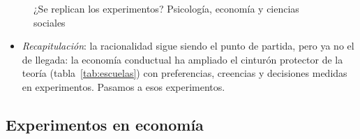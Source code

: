 \documentclass[11pt]{article}
\begin{document}
\begin{figure}[H]
\centering
\caption{¿Se replican los experimentos? Psicología, economía y ciencias sociales}\label{fig:replicacion-experimentos}
\end{figure}

\begin{itemize}
\item \emph{Recapitulación}: la racionalidad sigue siendo el punto de partida, pero ya no el de llegada: la economía conductual ha ampliado el cinturón protector de la teoría (tabla~\ref{tab:escuelas}) con preferencias, creencias y decisiones medidas en experimentos. Pasamos a esos experimentos.
\end{itemize}

\subsection{Experimentos en economía}\label{sec:experimentos}
\end{document}
